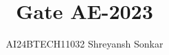 \documentclass[journal]{IEEEtran}
\begin{document}

\vspace{3cm}

\title{Gate AE-2023}
\author{AI24BTECH11032 Shreyansh Sonkar}
{\let\newpage\relax\maketitle}

\renewcommand{\thefigure}{\theenumi}
\renewcommand{\thetable}{\theenumi}
\setlength{\intextsep}{10pt} %


\renewcommand{\thetable}{\theenumi}
\end{document}
